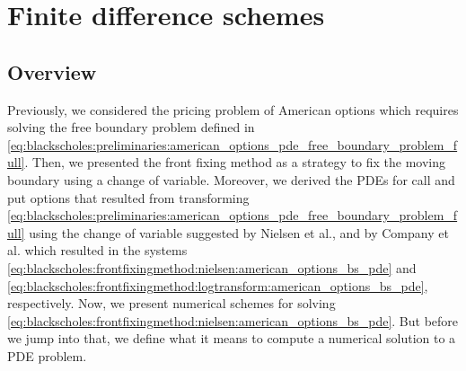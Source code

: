 \section{Finite difference schemes} \label{sec:finitedifferencesschemes}
\subsection{Overview}
Previously, we considered the pricing problem of American options which requires solving the free boundary problem defined in \eqref{eq:blackscholes:preliminaries:american_options_pde_free_boundary_problem_full}.
Then, we presented the front fixing method as a strategy to fix the moving boundary using a change of variable. Moreover, we derived the PDEs for call and put options that resulted from transforming \eqref{eq:blackscholes:preliminaries:american_options_pde_free_boundary_problem_full} using the change of variable suggested by Nielsen et al.\cite{nielsen_2001}, and by Company et al.\cite{company_egorova_jodar_2014} which resulted in the systems \eqref{eq:blackscholes:frontfixingmethod:nielsen:american_options_bs_pde} and \eqref{eq:blackscholes:frontfixingmethod:logtransform:american_options_bs_pde}, respectively. Now, we present numerical schemes for solving \eqref{eq:blackscholes:frontfixingmethod:nielsen:american_options_bs_pde}. But before we jump into that, we define what it means to compute a numerical solution to a PDE problem.

